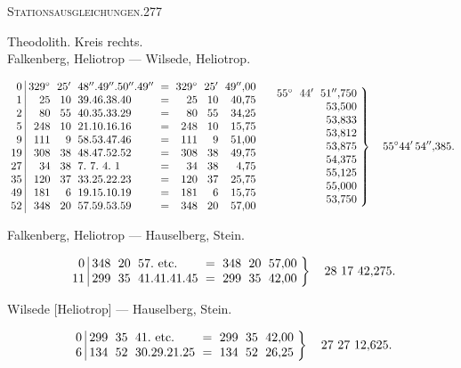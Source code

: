 \clearpage
\noindent\mbox{}\hfill\textsc{Stationsausgleichungen.}\hfill277\par\medskip
\begin{center}
Theodolith. Kreis rechts.\\[4pt]
Falkenberg, Heliotrop --- Wilsede, Heliotrop.
\end{center}
\[
\setlength{\arraycolsep}{3pt}
\begin{array}{r|rrlcrrr}
0&329^\circ&25'&48''.49''.50''.49''&=&329^\circ&25'&49''{,}00\\
1&25&10&39.46.38.40&=&25&10&40{,}75\\
2&80&55&40.35.33.29&=&80&55&34{,}25\\
5&248&10&21.10.16.16&=&248&10&15{,}75\\
9&111&9&58.53.47.46&=&111&9&51{,}00\\
19&308&38&48.47.52.52&=&308&38&49{,}75\\
27&34&38&7.\ 7.\ 4.\ 1&=&34&38&4{,}75\\
35&120&37&33.25.22.23&=&120&37&25{,}75\\
49&181&6&19.15.10.19&=&181&6&15{,}75\\
52&348&20&57.59.53.59&=&348&20&57{,}00
\end{array}
\quad
\left.\begin{array}{rrr}
55^\circ&44'&51''{,}750\\&&53{,}500\\&&53{,}833\\&&53{,}812\\&&53{,}875\\
&&54{,}375\\&&55{,}125\\&&55{,}000\\&&53{,}750
\end{array}\right\}\quad55^\circ44'\,54''{,}385.
\]
\begin{center}Falkenberg, Heliotrop --- Hauselberg, Stein.\end{center}
\[
\setlength{\arraycolsep}{3pt}
\left.\begin{array}{r|rrlcrrr}
0&348&20&57.\ \text{etc.}&=&348&20&57{,}00\\
11&299&35&41.41.41.45&=&299&35&42{,}00
\end{array}\right\}\quad28\ 17\ 42{,}275.
\]
\begin{center}Wilsede [Heliotrop] --- Hauselberg, Stein.\end{center}
\[
\setlength{\arraycolsep}{3pt}
\left.\begin{array}{r|rrlcrrr}
0&299&35&41.\ \text{etc.}&=&299&35&42{,}00\\
6&134&52&30.29.21.25&=&134&52&26{,}25
\end{array}\right\}\quad27\ 27\ 12{,}625.
\]
